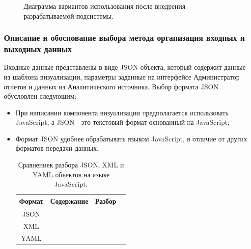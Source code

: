 \documentclass[a4paper]{extarticle}
\begin{document}
\begin{figure}[H]
\caption{Диаграмма вариантов использования после внедрения разрабатываемой подсистемы.}
\label{ris2}
\end{figure}\par

\subsubsection{Описание и обоснование выбора метода организация входных и выходных данных}
Входные данные представлены в виде JSON-объекта, который содержит данные из шаблона визуализации, параметры заданные на интерфейсе Администратор отчетов и данных из Аналитического источника. Выбор формата JSON обусловлен следующим:
\begin{itemize}
\item При написании компонента визуализации предполагается использовать JavaScript, а JSON - это текстовый формат основанный на JavaScript;
\item Формат JSON удобнее обрабатывать языком JavaScript, в отличие от других форматов передачи данных.

\begin{table}[H]
\caption{Сравнениек разбора JSON, XML и YAML объектов на языке JavaScript.}
\centering
  \begin{tabular}{|c|c|c|c|}
  \hline
  Формат & Содержание & Разбор \\\hline
  JSON  &  
  & 
  \\\hline
  XML   &  
  & 
  \\\hline
  YAML  & 
  & 
  \\\hline
  \end{tabular}
\end{table}\par
\end{itemize}
\end{document}
